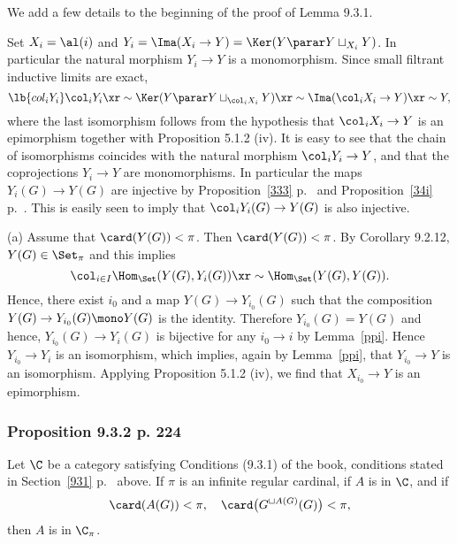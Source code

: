\documentclass[12pt]{article}
\theoremstyle{remark}
\theoremstyle{definition}
\begin{document}


We add a few details to the beginning of the proof of Lemma 9.3.1. 

Set $X_i=\al(i)$ and $Y_i=\Ima(X_i\to Y)=\Ker(Y\parar Y\sqcup_{X_i}Y)$. In particular the natural morphism $Y_i\to Y$ is a monomorphism. Since small filtrant inductive limits are exact, 
\begin{equation}\lb{col_iY_i}
\col_iY_i\xr\sim\Ker(Y\parar Y\sqcup_{\col_iX_i}Y)\xr\sim\Ima(\col_iX_i\to Y)\xr\sim Y,
\end{equation} 
where the last isomorphism follows from the hypothesis that $\col_iX_i\to Y$ is an epimorphism together with Proposition 5.1.2 (iv). It is easy to see that the chain of isomorphisms  coincides with the natural morphism $\col_iY_i\to Y$, and that the coprojections $Y_i\to Y$ are monomorphisms. In particular the maps $Y_i(G)\to Y(G)$ are injective by Proposition~\ref{333} p.~ and Proposition~\ref{34i} p.~. This is easily seen to imply that $\col_iY_i(G)\to Y(G)$ is also injective. 

\nn(a) Assume that $\card(Y(G))<\pi$. Then $\card(Y(G))<\pi$. By Corollary 9.2.12, $Y(G)\in\Set_\pi$ and this implies 
$$
\col_{i\in I}\Hom_\Set(Y(G),Y_i(G))\xr\sim\Hom_\Set(Y(G),Y(G)).
$$ 
Hence, there exist $i_0$ and a map $Y(G)\to Y_{i_0}(G)$ such that the composition $Y(G)\to Y_{i_0}(G)\mono Y(G)$ is the identity. Therefore $Y_{i_0}(G)=Y(G)$ and hence, $Y_{i_0}(G)\to Y_i (G)$ is bijective for any $i_0\to i$ by Lemma~\ref{ppi}. Hence $Y_{i_0}\to Y_i$ is an isomorphism, which implies, again by Lemma~\ref{ppi}, that $Y_{i_0}\to Y$ is an isomorphism. Applying Proposition 5.1.2 (iv), we find that $X_{i_0}\to Y$ is an epimorphism. 

%

\subsubsection{Proposition 9.3.2 p. 224}

\begin{prop}[Proposition 9.3.2 p.~224] 
Let $\C$ be a category satisfying Conditions (9.3.1) of the book, conditions stated in Section~\ref{931} p.~ above. If $\pi$ is an infinite regular cardinal, if $A$ is in $\C$, and if 
$$
\card(A(G))<\pi,\quad\card\big(G^{\sqcup A(G)}(G)\big)<\pi,
$$ 
then $A$ is in $\C_\pi$.
\end{prop}
\end{document}
